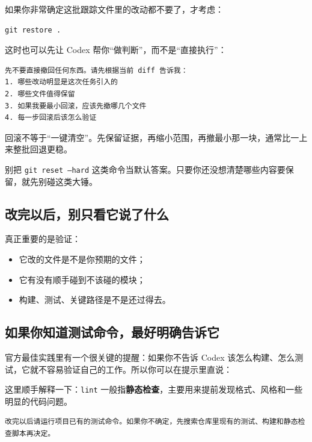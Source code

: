\documentclass[UTF8,a4paper,12pt]{ctexart}
\begin{document}
如果你非常确定这批跟踪文件里的改动都不要了，才考虑：

\begin{lstlisting}[style=cli]
git restore .
\end{lstlisting}

这时也可以先让 Codex 帮你“做判断”，而不是“直接执行”：

\begin{lstlisting}[style=prompt]
先不要直接撤回任何东西。请先根据当前 diff 告诉我：
1. 哪些改动明显是这次任务引入的
2. 哪些文件值得保留
3. 如果我要最小回滚，应该先撤哪几个文件
4. 每一步回滚后该怎么验证
\end{lstlisting}

\begin{tipbox}
回滚不等于“一键清空”。先保留证据，再缩小范围，再撤最小那一块，通常比一上来整批回退更稳。
\end{tipbox}

\begin{warnbox}
别把 \texttt{git reset --hard} 这类命令当默认答案。只要你还没想清楚哪些内容要保留，就先别碰这类大锤。
\end{warnbox}

\subsection{改完以后，别只看它说了什么}

真正重要的是验证：
\begin{itemize}
  \item 它改的文件是不是你预期的文件；
  \item 它有没有顺手碰到不该碰的模块；
  \item 构建、测试、关键路径是不是还过得去。
\end{itemize}

\subsection{如果你知道测试命令，最好明确告诉它}

官方最佳实践里有一个很关键的提醒：如果你不告诉 Codex 该怎么构建、怎么测试，它就不容易验证自己的工作。所以你可以在提示里直说：

这里顺手解释一下：\texttt{lint} 一般指\textbf{静态检查}，主要用来提前发现格式、风格和一些明显的代码问题。

\begin{lstlisting}[style=prompt]
改完以后请运行项目已有的测试命令。如果你不确定，先搜索仓库里现有的测试、构建和静态检查脚本再决定。
\end{lstlisting}
\end{document}
